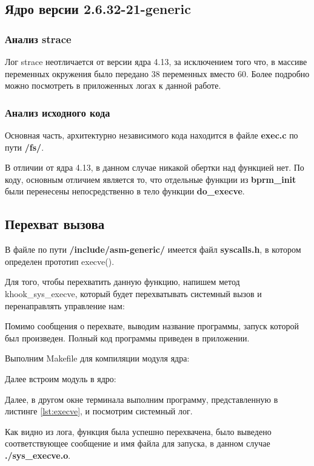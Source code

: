\subsection{Ядро версии 2.6.32-21-generic}
\subsubsection{Анализ strace}
Лог strace неотличается от версии ядра 4.13, за исключением того что, в массиве переменных окружения было передано 38 переменных вместо 60. Более подробно можно посмотреть в приложенных логах к данной работе.
\subsubsection{Анализ исходного кода}
Основная часть, архитектурно независимого кода находится в файле \textbf{exec.c} по пути \textbf{/fs/}.

В отличии от ядра 4.13, в данном случае никакой обертки над функцией нет. По коду, основным отличием является то, что отдельные функции из \textbf{bprm\_init} были перенесены непосредственно в тело функции \textbf{do\_execve}.

\subsection{Перехват вызова}
В файле по пути \textbf{/include/asm-generic/} имеется файл \textbf{syscalls.h}, в котором определен прототип execve().

Для того, чтобы перехватить данную функцию, напишем метод khook\_sys\_execve, который будет перехватывать системный вызов и перенаправлять управление нам:


Помимо сообщения о перехвате, выводим название программы, запуск которой был произведен. Полный код программы приведен в приложении.  

Выполним Makefile для компиляции модуля ядра:

Далее встроим модуль в ядро:

Далее, в другом окне терминала выполним программу, представленную в листинге \ref{lst:execve}, и посмотрим системный лог.

Как видно из лога, функция была успешно перехвачена, было выведено соответствующее сообщение и имя файла для запуска, в данном случае \textbf{./sys\_execve.o}.

